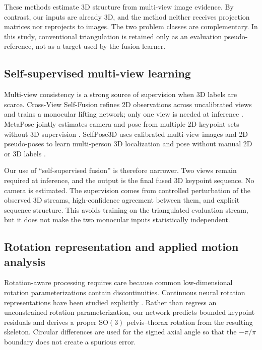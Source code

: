 These methods estimate 3D structure from multi-view image evidence. By contrast,
our inputs are already 3D, and the method neither receives projection matrices
nor reprojects to images. The two problem classes are complementary. In this
study, conventional triangulation is retained only as an evaluation
pseudo-reference, not as a target used by the fusion learner.

\subsection{Self-supervised multi-view learning}

Multi-view consistency is a strong source of supervision when 3D labels are
scarce. Cross-View Self-Fusion refines 2D observations across uncalibrated views
and trains a monocular lifting network; only one view is needed at inference
\citep{Kim2022CrossViewSelfFusion}. MetaPose jointly estimates camera and pose
from multiple 2D keypoint sets without 3D supervision
\citep{Usman2022MetaPose}. SelfPose3D uses calibrated multi-view images and 2D
pseudo-poses to learn multi-person 3D localization and pose without manual 2D or
3D labels \citep{Srivastav2024SelfPose3D}.

Our use of ``self-supervised fusion'' is therefore narrower. Two views remain
required at inference, and the output is the final fused 3D keypoint sequence.
No camera is estimated. The supervision comes from controlled perturbation of
the observed 3D streams, high-confidence agreement between them, and explicit
sequence structure. This avoids training on the triangulated evaluation stream,
but it does not make the two monocular inputs statistically independent.

\subsection{Rotation representation and applied motion analysis}

Rotation-aware processing requires care because common low-dimensional rotation
parameterizations contain discontinuities. Continuous neural rotation
representations have been studied explicitly \citep{Zhou2019Rotation}. Rather
than regress an unconstrained rotation parameterization, our network predicts
bounded keypoint residuals and derives a proper $\mathrm{SO}(3)$
pelvis--thorax rotation from the resulting skeleton. Circular differences are
used for the signed axial angle so that the $-\pi/\pi$ boundary does not create a
spurious error.


